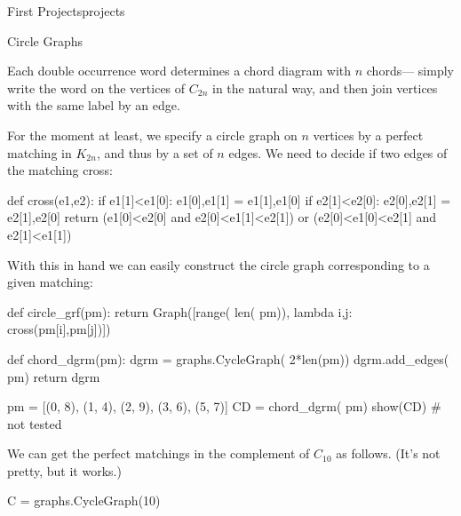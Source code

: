 \begin{chap}{First Projects}{projects}
\begin{sect}{Circle Graphs}
\begin{para}
Each double occurrence word determines a chord diagram with $n$ chords---
simply write the word on the vertices of $C_{2n}$ in the natural way, and then
join vertices with the same label by an edge.
\end{para}
%
\begin{para}
For the moment at least, we specify a circle graph on $n$ vertices by a 
perfect matching in $K_{2n}$, and thus by a set of $n$ edges.
We need to decide if two edges of the matching cross:
\end{para}
%
\begin{sagecode}
\begin{sageinput}
def cross(e1,e2):
    if e1[1]<e1[0]: e1[0],e1[1] = e1[1],e1[0]
    if e2[1]<e2[0]: e2[0],e2[1] = e2[1],e2[0]
    return (e1[0]<e2[0] and e2[0]<e1[1]<e2[1]) or (e2[0]<e1[0]<e2[1] and e2[1]<e1[1])
\end{sageinput}
\end{sagecode}
%
\begin{para}
With this in hand we can easily construct the circle graph corresponding
to a given matching:
\end{para}
%
\begin{sagecode}
\begin{sageinput}
def circle_grf(pm):
    return Graph([range( len( pm)), lambda i,j: cross(pm[i],pm[j])])
\end{sageinput}
\end{sagecode}
%
\begin{sagecode}
\begin{sageinput}
def chord_dgrm(pm):
    dgrm = graphs.CycleGraph( 2*len(pm))
    dgrm.add_edges( pm)
    return dgrm
\end{sageinput}
\end{sagecode}
%
\begin{sagecode}
\begin{sageinput}
pm = [(0, 8), (1, 4), (2, 9), (3, 6), (5, 7)]
CD = chord_dgrm( pm)
show(CD)  # not tested
\end{sageinput}
\begin{sageoutput}
\end{sageoutput}
\end{sagecode}
%
\begin{para}
We can get the perfect matchings in the complement of $C_{10}$ as follows.
(It's not pretty, but it works.)
\end{para}
%
\begin{sagecode}
\begin{sageinput}
C = graphs.CycleGraph(10)

\end{sageinput}
\end{sagecode}
\end{sect}
\end{chap}
